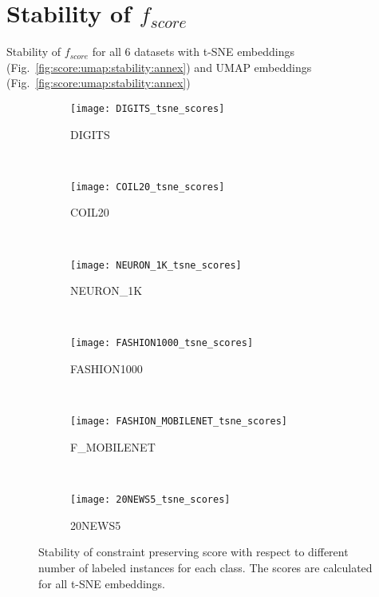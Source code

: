 \section{Stability of $f_{score}$}

Stability of $f_{score}$ for all 6 datasets with t-SNE embeddings (Fig.~\ref{fig:score:umap:stability:annex}) and UMAP embeddings (Fig.~\ref{fig:score:umap:stability:annex})

\begin{figure*}%
    \centering
    \begin{subfigure}[b]{0.152\textwidth}
        \centering
        \texttt{[image: DIGITS\_tsne\_scores]}
        \caption{DIGITS}
    \end{subfigure}
    ~
    \begin{subfigure}[b]{0.152\textwidth}
        \texttt{[image: COIL20\_tsne\_scores]}
        \caption{COIL20}
    \end{subfigure}
    ~
    \begin{subfigure}[b]{0.152\textwidth}
        \texttt{[image: NEURON\_1K\_tsne\_scores]}
        \caption{NEURON\_1K}
    \end{subfigure}
    ~
    \begin{subfigure}[b]{0.152\textwidth}
        \centering
        \texttt{[image: FASHION1000\_tsne\_scores]}
        \caption{FASHION1000}
    \end{subfigure}
    ~
    \begin{subfigure}[b]{0.152\textwidth}
        \texttt{[image: FASHION\_MOBILENET\_tsne\_scores]}
        \caption{F\_MOBILENET}
    \end{subfigure}
    ~
    \begin{subfigure}[b]{0.152\textwidth}
        \texttt{[image: 20NEWS5\_tsne\_scores]}
        \caption{20NEWS5}
    \end{subfigure}
    \caption{Stability of constraint preserving score with respect to different number of labeled instances for each class. The scores are calculated for all t-SNE embeddings.}
    \label{fig:score:tsne:stability:annex}
\end{figure*}


